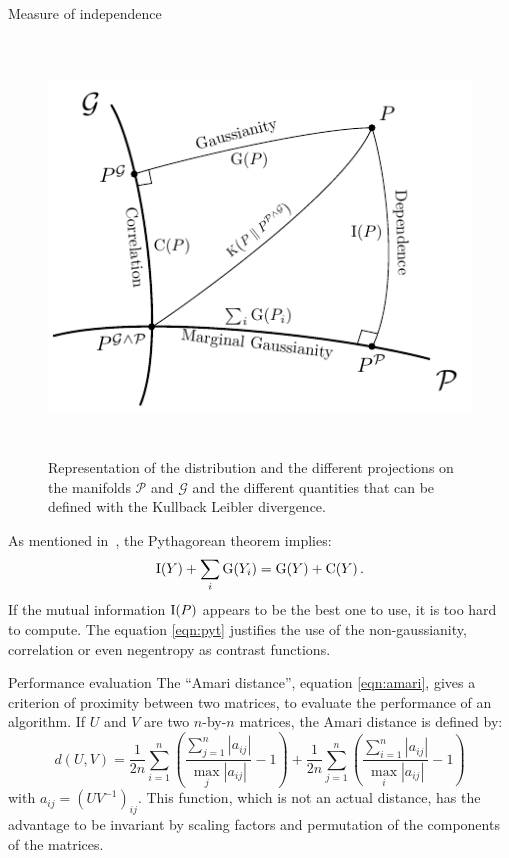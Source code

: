 \documentclass{beamer}
\newcommand{\zZ}[2]{\mathrm #1\!\zp{#2}}
\newcommand{\zD}{\mathcal}
\begin{document}
\begin{frame}{}
\begin{columns}[T]
\begin{column}{.48\linewidth}
\begin{block}{Measure of independence}
\begin{figure}
\label{fig:sketch}
\centering
  \includegraphics[height = 11cm, width=\textwidth]{../figure_tikz/theory_info}
  \caption{Representation of the distribution and the different projections on the manifolds $\zD P$ and $\zD G$ and the different quantities that can be defined with the Kullback Leibler divergence.}
\end{figure}

As mentioned in~\cite{}, the Pythagorean theorem implies:
\begin{equation}
\label{eqn:pyt}
        \zZ IY + \sum_i\zZ G{Y_i} = \zZ GY + \zZ CY.
\end{equation}
If the mutual information $\zZ I P$ appears to be the best one to use, it is too hard to compute.
The equation \ref{eqn:pyt} justifies the use of the non-gaussianity, correlation or even negentropy as contrast functions.

\end{block}


\begin{block}{Performance evaluation}
The ``Amari distance'', equation \ref{eqn:amari}, gives a criterion of proximity between two matrices, to evaluate the performance of an algorithm.
If $U$ and $V$ are two $n$-by-$n$ matrices, the Amari distance is defined by:
\begin{equation} \label{eqn:amari}
	d(U,V) = \frac{1}{2n}\sum\limits_{i=1}^n \left(\frac{\sum\limits_{j=1}^n|a_{ij}|}{\max_j |a_{ij}|}-1 \right)+\frac{1}{2n}\sum\limits_{j=1}^n \left(\frac{\sum\limits_{i=1}^n|a_{ij}|}{\max_i |a_{ij}|}-1 \right)
\end{equation}
with $a_{ij} = (UV^{-1})_{ij}$.
This function, which is not an actual distance, has the advantage to be invariant by scaling factors and permutation of the components of the matrices.


\end{block}
\end{column}
\end{columns}
\end{frame}
\end{document}

